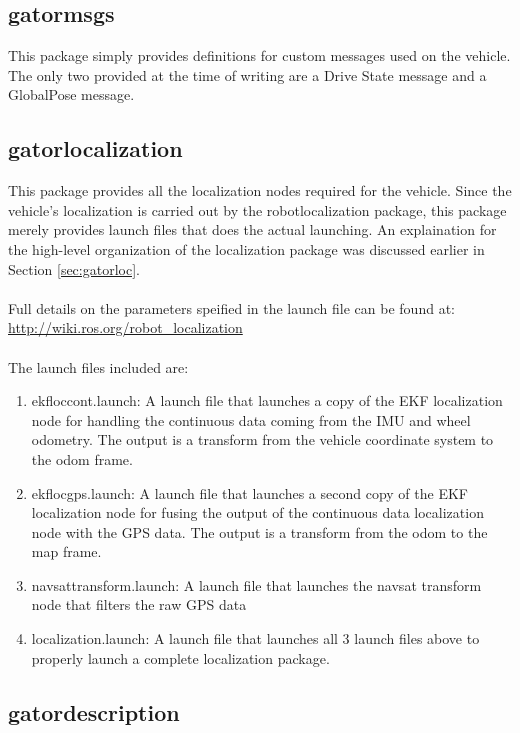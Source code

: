 \subsection{gator\textunderscore msgs}

This package simply provides definitions for custom messages used on the vehicle. The only two provided at the time of writing are a Drive State message and a GlobalPose message.

\subsection{gator\textunderscore localization}

This package provides all the localization nodes required for the vehicle. Since the vehicle's localization is carried out by the robot\textunderscore localization package, this package merely provides launch files that does the actual launching. An explaination for the high-level organization of the localization package was discussed earlier in Section \ref{sec:gatorloc}.\\ \\
%
Full details on the parameters speified in the launch file can be found at: \url{http://wiki.ros.org/robot_localization}\\ \\
%
The launch files included are:

\begin{enumerate}
\item ekf\textunderscore loc\textunderscore cont.launch: A launch file that launches a copy of the EKF localization node for handling the continuous data coming from the IMU and wheel odometry. The output is a transform from the vehicle coordinate system to the odom frame.
\item ekf\textunderscore loc\textunderscore gps.launch: A launch file that launches a second copy of the EKF localization node for fusing the output of the continuous data localization node with the GPS data. The output is a transform from the odom to the map frame.
\item navsat\textunderscore transform.launch: A launch file that launches the navsat transform node that filters the raw GPS data
\item localization.launch: A launch file that launches all 3 launch files above to properly launch a complete localization package.
\end{enumerate}

\subsection{gator\textunderscore description}

